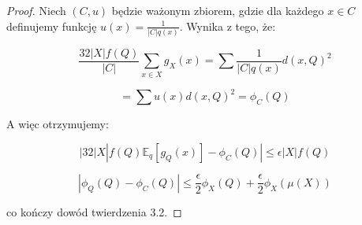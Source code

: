 \begin{proof}
\noindent
Niech $(C, u)$ będzie ważonym zbiorem, gdzie dla każdego $x \in C$ definujemy funkcję $u(x) = \frac{1}{|C|q(x)}$.
Wynika z tego, że:

\begin{equation}
    \frac{32|X|f(Q)}{|C|} \sum_{x \in X}g_{X}(x) = \sum \frac{1}{|C|q(x)} d(x, Q)^2
\end{equation}

\begin{equation}
    = \sum u(x) d(x, Q)^2 = \phi_{C}(Q)
\end{equation}

\noindent
A więc otrzymujemy:

\begin{equation}
    |32|X|f(Q)\mathbb{E}_q[g_{Q}(x)] - \phi_{C}(Q)| \leq \epsilon|X|f(Q)
\end{equation}

\begin{equation}
    |\phi_{Q}(Q) - \phi_{C}(Q)| \leq \frac{\epsilon}{2}\phi_{X}(Q) + \frac{\epsilon}{2}\phi_{X}(\mu(X))
\end{equation}

\noindent
co kończy dowód twierdzenia 3.2.

\end{proof}